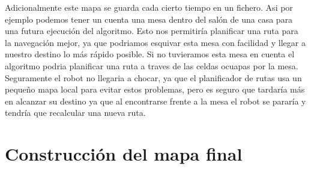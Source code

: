 Adicionalmente este mapa se guarda cada cierto tiempo en un fichero. Asi por ejemplo podemos tener un cuenta una mesa dentro del salón de una casa para una futura ejecución del algoritmo. Esto nos permitiría planificar una ruta para la navegación mejor, ya que podriamos esquivar esta mesa con facilidad y llegar a nuestro destino lo más rápido posible. Si no tuvieramos esta mesa en cuenta el algoritmo podria planificar una ruta a traves de las celdas ocuapas por la mesa. Seguramente el robot no llegaria a chocar, ya que el planificador de rutas usa un pequeño mapa local para evitar estos problemas, pero es seguro que tardaría más en alcanzar su destino ya que al encontrarse frente a la mesa el robot se pararía y tendría que recalcular una nueva ruta. 



\section{Construcción del mapa final}
\label{sec:construccionmap}

